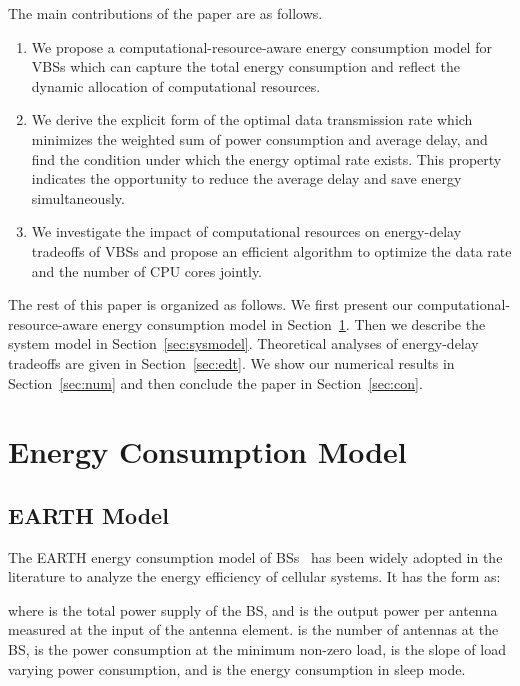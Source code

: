 \documentclass[conference]{IEEEtran}
\begin{document}
The main contributions of the paper are as follows.
\begin{enumerate}
  \item We propose a computational-resource-aware energy consumption model for
    VBSs which can capture the total energy consumption and
    reflect the dynamic allocation of computational resources.

  \item We derive the explicit form of the optimal data transmission rate
    which minimizes the weighted sum of power consumption and average delay,
    and find the condition under which the energy optimal rate exists. This
    property
    indicates the opportunity to reduce the average delay and save energy
    simultaneously.

  \item We investigate the impact of computational resources on energy-delay
    tradeoffs of VBSs and propose an efficient algorithm to optimize the data
    rate and the number of CPU cores jointly.

\end{enumerate}

The rest of this paper is organized as follows. We first present our
computational-resource-aware energy consumption model in
Section~\ref{sec:model}. Then we
describe the system model in Section~\ref{sec:sysmodel}.  Theoretical analyses
of energy-delay tradeoffs are given in Section~\ref{sec:edt}.  We show our
numerical results in Section~\ref{sec:num} and then conclude the paper in
Section~\ref{sec:con}.

\section{Energy Consumption Model}
\label{sec:model}
\subsection{EARTH Model}
The EARTH energy consumption model of BSs~\cite{auer2011howmuch}
has been widely adopted in
the literature to analyze the energy efficiency of cellular systems.
It has the form as:

where  is the total power supply of the BS,
and  is the output power per antenna measured at the input of the
antenna element.
 is the number of antennas at the BS,
 is the power consumption at the minimum non-zero load,
 is the slope of load varying power consumption,
and  is the energy consumption in sleep mode.
\end{document}
